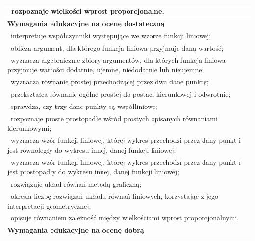 \documentclass[12pt,a4paper]{article}
\begin{document}
\begin{longtable}{|p{16cm}|}
		\textbullet\ rozpoznaje wielkości wprost proporcjonalne. \\ \hline
		
		\textbf{Wymagania edukacyjne na ocenę dostateczną} \\ \hline
		
		\textbullet\ interpretuje współczynniki występujące we wzorze funkcji liniowej; \\
		
		\textbullet\ oblicza argument, dla którego funkcja liniowa przyjmuje daną wartość; \\
		
		\textbullet\ wyznacza algebraicznie zbiory argumentów, dla których funkcja liniowa przyjmuje wartości dodatnie, ujemne, niedodatnie lub nieujemne; \\
		
		\textbullet\ wyznacza równanie prostej przechodzącej przez dwa dane punkty; \\
		
		\textbullet\ przekształca równanie ogólne prostej do postaci kierunkowej i odwrotnie; \\
		
		\textbullet\ sprawdza, czy trzy dane punkty są współliniowe; \\
		
		\textbullet\ rozpoznaje proste prostopadłe wśród prostych opisanych równaniami kierunkowymi; \\
		
		\textbullet\ wyznacza wzór funkcji liniowej, której wykres przechodzi przez dany punkt i jest równoległy do wykresu innej, danej funkcji liniowej; \\
		
		\textbullet\ wyznacza wzór funkcji liniowej, której wykres przechodzi przez dany punkt i jest prostopadły do wykresu innej, danej funkcji liniowej; \\
		
		\textbullet\ rozwiązuje układ równań metodą graficzną; \\
		
		\textbullet\ określa liczbę rozwiązań układu równań liniowych, korzystając z jego interpretacji geometrycznej; \\
		
		\textbullet\ opisuje równaniem zależność między wielkościami wprost proporcjonalnymi. \\ \hline
		
		\textbf{Wymagania edukacyjne na ocenę dobrą} \\ \hline
		

\end{longtable}
\end{document}
